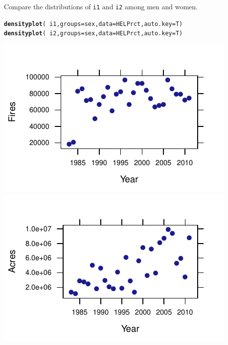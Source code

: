 \documentclass[twoside]{book}\usepackage[]{graphicx}\usepackage[]{xcolor}
\makeatletter
\def\maxwidth{ %
  \ifdim\Gin@nat@width>\linewidth
    \linewidth
  \else
    \Gin@nat@width
  \fi
}
\newcommand{\hlopt}[1]{\textcolor[rgb]{0,0,0}{#1}}%
\newcommand{\hlstd}[1]{\textcolor[rgb]{0.345,0.345,0.345}{#1}}%
\newcommand{\hlkwc}[1]{\textcolor[rgb]{0.333,0.667,0.333}{#1}}%
\newcommand{\hlkwd}[1]{\textcolor[rgb]{0.737,0.353,0.396}{\textbf{#1}}}%
\newenvironment{kframe}{%
 \def\at@end@of@kframe{}%
 \ifinner\ifhmode%
  \def\at@end@of@kframe{\end{minipage}}%
  \begin{minipage}{\columnwidth}%
 \fi\fi%
 \def\FrameCommand##1{\hskip\@totalleftmargin \hskip-\fboxsep
 \colorbox{shadecolor}{##1}\hskip-\fboxsep
     \hskip-\linewidth \hskip-\@totalleftmargin \hskip\columnwidth}%
 \MakeFramed {\advance\hsize-\width
   \@totalleftmargin\z@ \linewidth\hsize
   \@setminipage}}%
 {\par\unskip\endMakeFramed%
 \at@end@of@kframe}
\newenvironment{knitrout}{}{} %
\newcommand{\variable}[1]{{\color{green!50!black}\texttt{#1}}}
\makeatother
\begin{document}
\begin{problem}
	Compare the distributions of \variable{i1} and \variable{i2} among men
	and women.
\end{problem}
\begin{solution}
\begin{knitrout}
\color{fgcolor}\begin{kframe}
\begin{alltt}
\hlkwd{densityplot}\hlstd{(}\hlopt{~}\hlstd{i1,} \hlkwc{groups} \hlstd{= sex,} \hlkwc{data} \hlstd{= HELPrct,} \hlkwc{auto.key} \hlstd{= T)}
\hlkwd{densityplot}\hlstd{(}\hlopt{~}\hlstd{i2,} \hlkwc{groups} \hlstd{= sex,} \hlkwc{data} \hlstd{= HELPrct,} \hlkwc{auto.key} \hlstd{= T)}
\end{alltt}
\end{kframe}

{\centering \includegraphics[width=\maxwidth]{figures/fig-unnamed-chunk-32-1} 
\includegraphics[width=\maxwidth]{figures/fig-unnamed-chunk-32-2} 

}
\end{knitrout}
\end{solution}
\end{document}
